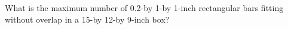 What is the maximum number of 0.2-by 1-by 1-inch rectangular bars fitting without overlap in a 15-by 12-by 9-inch box?
